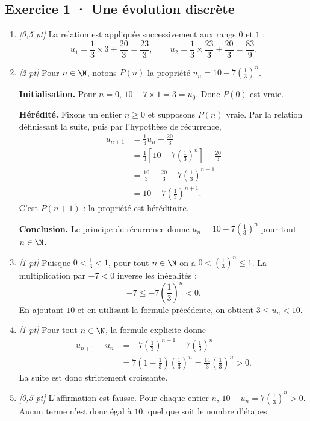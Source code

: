 \subsection*{Exercice 1 · Une évolution discrète}\begin{enumerate}

\item \textit{[0,5 pt]} La relation est appliquée successivement aux rangs $0$ et $1$ :\[u_1=\frac{1}{3}\times 3+\frac{20}{3}=\frac{23}{3},\qquad u_2=\frac{1}{3}\times \frac{23}{3}+\frac{20}{3}=\frac{83}{9}.\]

\item \textit{[2 pt]} Pour $n\in\N$, notons $P(n)$ la propriété $u_n=10-7\left(\frac{1}{3}\right)^n$.
\par\smallskip\textbf{Initialisation.} Pour $n=0$, $10-7\times1=3=u_0$. Donc $P(0)$ est vraie.
\par\smallskip\textbf{Hérédité.} Fixons un entier $n\ge0$ et supposons $P(n)$ vraie. Par la relation définissant la suite, puis par l'hypothèse de récurrence,
\[\begin{aligned}u_{n+1}&=\frac{1}{3}u_n+\frac{20}{3}\\
&=\frac{1}{3}\left[10-7\left(\frac{1}{3}\right)^n\right]+\frac{20}{3}\\
&=\frac{10}{3}+\frac{20}{3}-7\left(\frac{1}{3}\right)^{n+1}\\
&=10-7\left(\frac{1}{3}\right)^{n+1}.
\end{aligned}\]
C'est $P(n+1)$ : la propriété est héréditaire.
\par\smallskip\textbf{Conclusion.} Le principe de récurrence donne $u_n=10-7\left(\frac{1}{3}\right)^n$ pour tout $n\in\N$.

\item \textit{[1 pt]} Puisque $0<\frac{1}{3}<1$, pour tout $n\in\N$ on a $0<(\frac{1}{3})^n\le1$. La multiplication par $-7<0$ inverse les inégalités :
\[-7\le-7(\frac{1}{3})^n<0.\]
En ajoutant $10$ et en utilisant la formule précédente, on obtient $3\le u_n<10$.

\item \textit{[1 pt]} Pour tout $n\in\N$, la formule explicite donne
\[\begin{aligned}u_{n+1}-u_n&=-7(\frac{1}{3})^{n+1}+7(\frac{1}{3})^n\\&=7(1-\frac{1}{3})(\frac{1}{3})^n=\frac{14}{3}(\frac{1}{3})^n>0.\end{aligned}\]
La suite est donc strictement croissante.

\item \textit{[0,5 pt]} L'affirmation est fausse. Pour chaque entier $n$, $10-u_n=7(\frac{1}{3})^n>0$. Aucun terme n'est donc égal à $10$, quel que soit le nombre d'étapes.

\end{enumerate}

